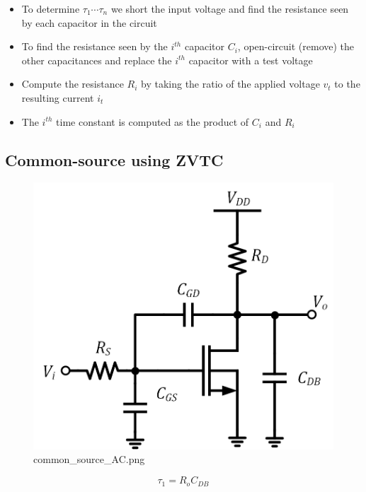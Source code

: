 \documentclass[11pt]{article}
\providecommand{\tightlist}{%
      \setlength{\itemsep}{0pt}\setlength{\parskip}{0pt}}
\begin{document}
    \begin{itemize}
\tightlist
\item
  To determine \(\tau_1 \cdots \tau_n\) we short the input voltage and
  find the resistance seen by each capacitor in the circuit
\item
  To find the resistance seen by the \(i^{th}\) capacitor \(C_i\),
  open-circuit (remove) the other capacitances and replace the
  \(i^{th}\) capacitor with a test voltage
\item
  Compute the resistance \(R_i\) by taking the ratio of the applied
  voltage \(v_t\) to the resulting current \(i_t\)
\item
  The \(i^{th}\) time constant is computed as the product of \(C_i\) and
  \(R_i\)
\end{itemize}

    \hypertarget{common-source-using-zvtc}{%
\subsection{Common-source using ZVTC}\label{common-source-using-zvtc}}

    \begin{figure}
\centering
\includegraphics{common_source_AC.png}
\caption{common\_source\_AC.png}
\end{figure}

    \begin{equation}
\tau_1 = R_o C_{DB}  
\end{equation}
\end{document}
